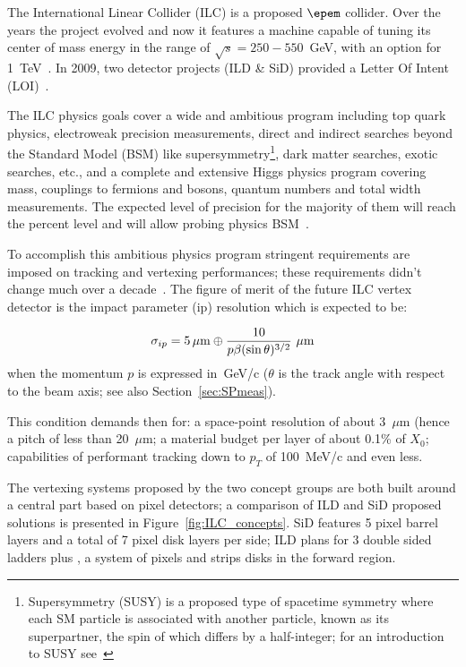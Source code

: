 The International Linear Collider (ILC) is a proposed $\epem$ collider. Over the years the project 
evolved and now it features a machine capable of tuning its center of mass energy in the range of 
$\sqrt{s}=250-550$~GeV, with an option for 1~TeV~\cite{ILCTDR}.  
In 2009, two detector projects (ILD \& SiD) provided a Letter Of Intent (LOI)~\cite{ILDLOI,SIDLOI}.

The ILC physics goals cover a wide and ambitious program including top quark physics, electroweak 
precision measurements, direct and indirect searches beyond the Standard Model (BSM) like 
supersymmetry\footnote{Supersymmetry (SUSY) is a proposed type of spacetime symmetry where  each 
SM particle is associated with another particle, known as its superpartner, the spin of which differs by a 
half-integer; for an introduction to SUSY see~\cite{SusyPrimer}}, 
dark matter searches, exotic searches, etc., and a complete and extensive Higgs physics program 
covering mass, couplings to fermions and bosons, quantum numbers and total width 
measurements.  The expected level of precision for the majority of them will 
reach the percent level and will allow probing physics BSM~\cite{ILCVertexing2016}.

To accomplish this ambitious physics program stringent requirements are imposed on tracking and 
vertexing performances; these requirements didn't change much over a 
decade~\cite{ILCVertexing2007,ILCVertexing2016}. 
The  figure of merit of the future ILC vertex detector  is the impact parameter (ip) resolution which is 
expected to be:

\begin{equation}
\sigma_{ip}=5\,\mu{\rm m}\oplus\dfrac{10}{p\beta(\sin\theta)^{3/2}}\,\,\mu{\rm m}
\label{eq:ILCipres}
\end{equation}
when the momentum $p$ is expressed in~GeV/c ($\theta$ is the track angle with respect to the beam 
axis; see also Section~\ref{sec:SPmeas}).

This condition demands then for: a space-point resolution of about 3~$\mu$m (hence a pitch of less 
than 20~$\mu$m; a material budget per layer of about 0.1\% of $X_0$; capabilities of performant    
tracking	down to $p_T$ of 100~MeV/c and even less.

The vertexing systems proposed by the two concept groups are both built around a central 
part based on pixel detectors; a comparison of ILD and SiD proposed solutions is presented in 
Figure~\ref{fig:ILC_concepts}. SiD features 5 pixel barrel layers and a total of 7 pixel disk layers 
per side; ILD plans for 3 double sided ladders plus , a system of pixels and strips disks  in the forward 
region.

